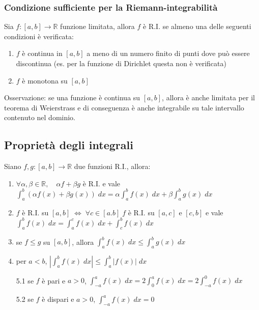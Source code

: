 \documentclass[a4paper]{article}
\begin{document}
\subsubsection*{Condizione sufficiente per la Riemann-integrabilità}
Sia \(f:\left[a, b\right] \to \mathbb{R}\) funzione limitata, allora \(f\) è R.I. se almeno una delle seguenti condizioni è verificata:
\begin{enumerate}
	\item \(f\) è continua in \(\left[a, b\right]\) a meno di un numero finito di punti dove può essere discontinua (es. per la funzione di Dirichlet questa non è verificata)
	\item \(f\) è monotona su \(\left[a, b\right]\)
\end{enumerate}
Osservazione: se una funzione è continua su \(\left[a, b\right]\), allora è anche limitata per il teorema di Weierstrass e di conseguenza
è anche integrabile su tale intervallo contenuto nel dominio.

\subsection{Proprietà degli integrali}
Siano \(f, g: \left[a, b\right] \to \mathbb{R}\) due funzioni R.I., allora:
\begin{enumerate}
	\item \(\forall \alpha, \beta \in \mathbb{R}, \quad \alpha f + \beta g\) è R.I. e vale \(\displaystyle \int_{a}^{b} \left(\alpha f(x) + \beta g(x)\right) \; dx = \alpha \int_{a}^{b} f(x) \; dx + \beta \int_{a}^{b} g(x) \; dx\)
	\item \(f\) è R.I. su \(\left[a, b\right] \; \Leftrightarrow \; \forall c \in \left[a. b\right] \; f\) è R.I. su \(\left[a, c\right]\) e \(\left[c, b\right]\) e vale 
	\(\displaystyle \int_{a}^{b} f(x) \; dx = \int_{a}^{c} f(x) \; dx + \int_{c}^{b} f(x) \; dx\)
	\item se \(f \leq g\) su \(\left[a, b\right]\), allora \(\displaystyle \int_{a}^{b} f(x) \; dx \leq \int_{a}^{b} g(x) \; dx\)
	\item per \(a < b\), \(\displaystyle \left| \int_{a}^{b} f(x) \; dx\right| \leq \int_{a}^{b} \left|f(x)\right| \; dx\)
	\item[5.1] se \(f\) è pari e \(a > 0\), \(\displaystyle \int_{-a}^{a} f(x) \; dx = 2 \int_{0}^{a} f(x) \; dx = 2 \int_{-a}^{0} f(x) \; dx\)
	\item[5.2] se \(f\) è dispari e \(a > 0\), \(\displaystyle \int_{-a}^{a} f(x) \; dx = 0\)
\end{enumerate}
\end{document}
